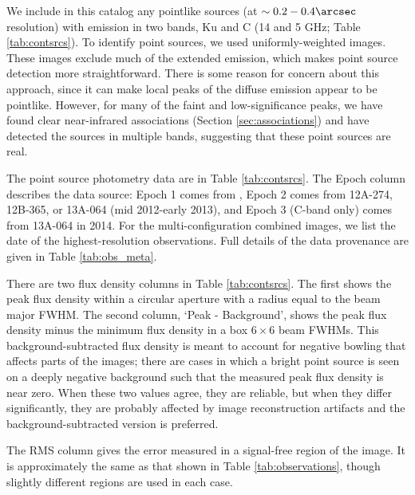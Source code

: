 

We include in this catalog any pointlike sources (at $\sim0.2-0.4\arcsec$
resolution) with emission in two bands, Ku and C (14 and 5 GHz; Table
\ref{tab:contsrcs}).  To identify point sources, we used uniformly-weighted
images.  These images exclude much of the extended emission, which makes point
source detection more straightforward.  There is some reason for concern about
this approach, since it can make local peaks of the diffuse emission appear to
be pointlike.  However, for many of the faint and low-significance peaks, we
have found clear near-infrared associations (Section \ref{sec:associations})
and have detected the sources in multiple bands, suggesting that these point
sources are real.

The point source photometry data are in Table \ref{tab:contsrcs}.  The Epoch column
describes the data source: Epoch 1 comes from \citet{Mehringer1994a}, Epoch 2
comes from 12A-274, 12B-365, or 13A-064 (mid 2012-early
2013), and Epoch 3 (C-band only) comes from
13A-064 in 2014. For the multi-configuration combined images, we list the date
of the highest-resolution observations.  Full details of the data provenance
are given in Table \ref{tab:obs_meta}.

There are two flux density columns in Table \ref{tab:contsrcs}.  The first
shows the peak flux density within a circular aperture with a
radius equal to the beam major FWHM.  The second column, `Peak -
Background', shows the peak flux density minus the minimum flux density in a
box $6\times6$ beam FWHMs.  This background-subtracted flux density is meant to
account for negative bowling that affects parts of the images; there are cases
in which a bright point source is seen on a deeply negative background such
that the measured peak flux density is near zero.  When these two values agree,
they are reliable, but when they differ significantly, they are probably
affected by image reconstruction artifacts and the background-subtracted
version is preferred.

The RMS column gives the error measured in a signal-free region of the image.
It is approximately the same as that shown in Table \ref{tab:observations},
though slightly different regions are used in each case.




